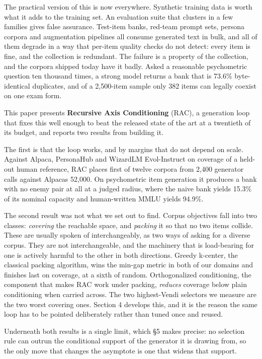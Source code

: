 \documentclass[
  10pt,
]{article}
\theoremstyle{plain}
\theoremstyle{definition}
\begin{document}
The practical version of this is now everywhere. Synthetic training data
is worth what it adds to the training set. An evaluation suite that
clusters in a few families gives false assurance. Test-item banks,
red-team prompt sets, persona corpora and augmentation pipelines all
consume generated text in bulk, and all of them degrade in a way that
per-item quality checks do not detect: every item is fine, and the
collection is redundant. The failure is a property of the collection,
and the corpora shipped today have it badly. Asked a reasonable
psychometric question ten thousand times, a strong model returns a bank
that is 73.6\% byte-identical duplicates, and of a 2,500-item sample
only 382 items can legally coexist on one exam form.

This paper presents \textbf{Recursive Axis Conditioning} (RAC), a
generation loop that fixes this well enough to beat the released state
of the art at a twentieth of its budget, and reports two results from
building it.

The first is that the loop works, and by margins that do not depend on
scale. Against Alpaca, PersonaHub and WizardLM Evol-Instruct on coverage
of a held-out human reference, RAC places first of twelve corpora from
2,400 generator calls against Alpaca\textquotesingle s 52,000. On
psychometric item generation it produces a bank with no enemy pair at
all at a judged radius, where the naive bank yields 15.3\% of its
nominal capacity and human-written MMLU yields 94.9\%.

The second result was not what we set out to find. Corpus objectives
fall into two classes: \emph{covering} the reachable space, and
\emph{packing} it so that no two items collide. These are usually spoken
of interchangeably, as two ways of asking for a diverse corpus. They are
not interchangeable, and the machinery that is load-bearing for one is
actively harmful to the other in both directions. Greedy k-center, the
classical packing algorithm, wins the min-gap metric in both of our
domains and finishes last on coverage, at a sixth of random.
Orthogonalized conditioning, the component that makes RAC work under
packing, \emph{reduces} coverage below plain conditioning when carried
across. The two highest-Vendi selectors we measure are the two worst
covering ones. Section 4 develops this, and it is the reason the same
loop has to be pointed deliberately rather than tuned once and reused.

Underneath both results is a single limit, which §5 makes precise: no
selection rule can outrun the conditional support of the generator it is
drawing from, so the only move that changes the asymptote is one that
widens that support.
\end{document}
